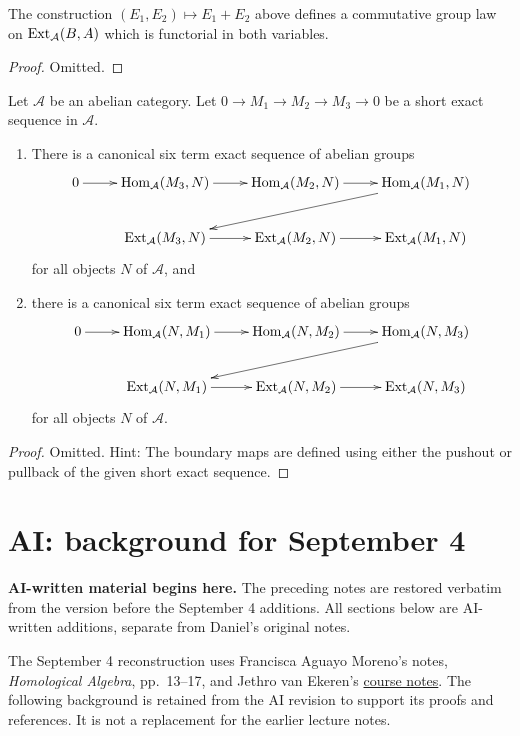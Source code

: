 \begin{lemma}
\label{lemma-baer-sum}
The construction $(E_1, E_2) \mapsto E_1 +
E_2$
above defines a commutative group
law on $\mathop{\mathrm{Ext}}\nolimits_\mathcal{A}(B, A)$ which is
functorial in both variables.
\end{lemma}

\begin{proof}
Omitted.
\end{proof}

\begin{lemma}
\label{lemma-six-term-sequence-ext}
Let $\mathcal{A}$ be an abelian category.
Let $0 \to M_1 \to M_2 \to M_3 \to 0$ be a
short exact sequence
in $\mathcal{A}$.
\begin{enumerate}
\item There is a canonical six term exact
sequence of abelian groups
$$
\xymatrix{
0 \ar[r] &
\Hom_\mathcal{A}(M_3, N) \ar[r] &
\Hom_\mathcal{A}(M_2, N) \ar[r] &
\Hom_\mathcal{A}(M_1, N) \ar[lld] \\
& \Ext_\mathcal{A}(M_3, N) \ar[r] &
\Ext_\mathcal{A}(M_2, N) \ar[r] &
\Ext_\mathcal{A}(M_1, N)
}
$$
for all objects $N$ of $\mathcal{A}$, and
\item there is a canonical six term exact
sequence of abelian groups
$$
\xymatrix{
0 \ar[r] &
\Hom_\mathcal{A}(N, M_1) \ar[r] &
\Hom_\mathcal{A}(N, M_2) \ar[r] &
\Hom_\mathcal{A}(N, M_3) \ar[lld] \\
& \Ext_\mathcal{A}(N, M_1) \ar[r] &
\Ext_\mathcal{A}(N, M_2) \ar[r] &
\Ext_\mathcal{A}(N, M_3)
}
$$
for all objects $N$ of $\mathcal{A}$.
\end{enumerate}
\end{lemma}

\begin{proof}
Omitted. Hint: The boundary maps are defined
using either the pushout
or pullback of the given short exact
sequence.
\end{proof}




\section{AI: background for September 4}
\label{section-ai-background-sept-four}

\noindent
\textbf{AI-written material begins here.}
The preceding notes are restored verbatim
from the version before the September 4
additions. All sections below are
AI-written additions, separate from
Daniel's original notes.

\medskip\noindent
The September 4 reconstruction uses
Francisca Aguayo Moreno's notes,
\emph{Homological Algebra}, pp.~13--17,
and Jethro van Ekeren's
\href{https://w3.impa.br/~jethro/2026-2/%
ah-current.pdf}{course notes}.
The following background is retained
from the AI revision to support its
proofs and references. It is not a
replacement for the earlier lecture
notes.

